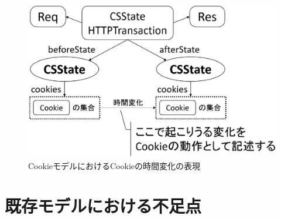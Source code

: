 \documentclass[12pt,a4paper]{jbook}
\begin{document}
\begin{figure}[htb]
\centering
\includegraphics[width=450pt]{./fig/cookie-model-transaction.eps}
\caption{CookieモデルにおけるCookieの時間変化の表現}
\label{fig:cookie-model-transaction}
\end{figure}
\color{black}

\section{既存モデルにおける不足点}
\color{red}
\color{black}
\end{document}
